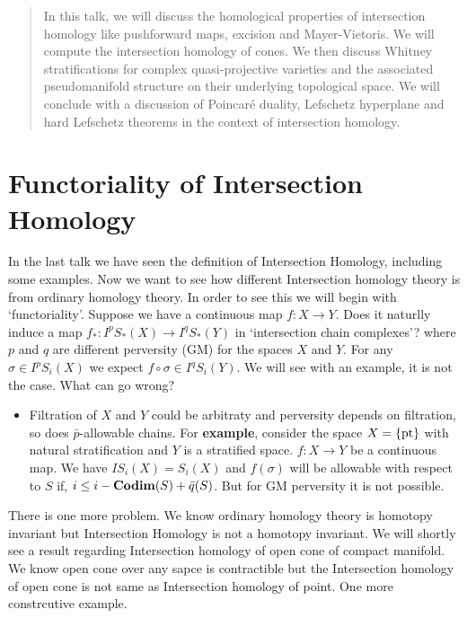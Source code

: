 \documentclass[11pt]{article}
\author{ \textsc{Trishan Mondal} \\[0.15cm]
  \href{https://www.isibang.ac.in}{Indian Statistical Institute, Bangalore}}
\date{}
\begin{document}
\maketitle 

\begin{abstract}
    \noindent In this talk, we will discuss the homological properties of intersection homology like pushforward maps, excision and Mayer-Vietoris. We will compute the intersection homology of cones. We then discuss Whitney stratifications for complex quasi-projective varieties and the associated pseudomanifold structure on their underlying topological space. We will conclude with a discussion of Poincaré duality, Lefschetz hyperplane and hard Lefschetz theorems in the context of intersection homology.
\end{abstract}

\section{Functoriality of Intersection Homology}

\noindent In the last talk we have seen the definition of Intersection Homology, including some examples. Now we want to see how different Intersection homology theory is from ordinary homology theory. In order to see this we will begin with `functoriality'. Suppose we have a continuous map $f:X\to Y$. Does it naturlly induce a map $f_{\ast} : I^{p}S_{\ast}(X)\to I^{q}S_{\ast}(Y)$ in `intersection chain complexes'? where $p$ and $q$ are different perversity (GM) for the spaces $X$ and $Y$. For any $\sigma \in I^pS_{i}(X)$ we expect $f \circ \sigma \in I^qS_i(Y)$. We will see with an example, it is not the case. What can go wrong? 

\begin{itemize}
    \item[] Filtration of $X$ and $Y$ could be arbitraty and perversity depends on filtration, so does $\bar{p}$-allowable chains. For \textbf{example}, consider the space $X = \qty{\text{pt}}$ with natural stratification and $Y$ is a stratified space. $f:X \to Y$ be a continuous map. We have $IS_i(X)=S_i(X)$ and $f(\sigma)$ will be allowable with respect to $S$ if, $i \leq i -\mathbf{Codim} (S) + \bar{q}(S)$. But for GM perversity it is not possible. 
\end{itemize}

\noindent There is one more problem. We know ordinary homology theory is homotopy invariant but Intersection Homology is not a homotopy invariant. We will shortly see a result regarding Intersection homology of open cone of compact manifold. We know open cone over any sapce is contractible  but the Intersection homology of open cone is not same as Intersection homology of point. One more constrcutive example. 
\end{document}
